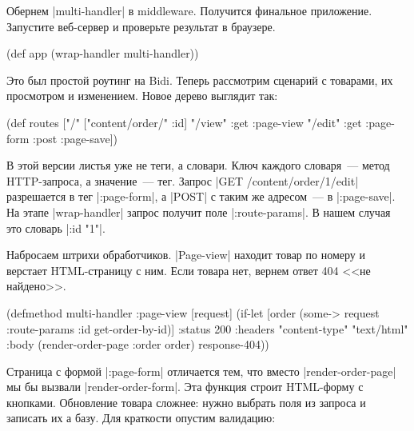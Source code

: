 Обернем \spverb|multi-handler| в middleware. Получится финальное
приложение. Запустите веб-сервер и проверьте результат в браузере.

\begin{english}
  \begin{clojure}
(def app (wrap-handler multi-handler))
  \end{clojure}
\end{english}

Это был простой роутинг на Bidi. Теперь рассмотрим сценарий с товарами, их
просмотром и изменением. Новое дерево выглядит так:

\begin{english}
  \begin{clojure}
(def routes
  ["/" {["content/order/" :id]
        {"/view" {:get  :page-view}
         "/edit" {:get  :page-form
                  :post :page-save}}}])
  \end{clojure}
\end{english}

В этой версии листья уже не теги, а словари. Ключ каждого словаря~--- метод
HTTP-запроса, а значение~--- тег. Запрос \spverb|GET /content/order/1/edit|
разрешается в тег \spverb|:page-form|, а \spverb|POST| с таким же адресом~--- в \spverb|:page-save|.
На этапе \spverb|wrap-handler| запрос получит поле \spverb|:route-params|.
В нашем случая это словарь \spverb|{:id "1"}|.

Набросаем штрихи обработчиков. \spverb|Page-view| находит товар по номеру и
верстает HTML-страницу с ним. Если товара нет, вернем ответ 404 <<не найдено>>.

\begin{english}
  \begin{clojure}
(defmethod multi-handler :page-view
  [request]
  (if-let [order (some-> request :route-params :id get-order-by-id)]
    {:status 200
     :headers {"content-type" "text/html"}
     :body (render-order-page {:order order})}
    response-404))
  \end{clojure}
\end{english}

Страница с формой \spverb|:page-form| отличается тем, что вместо
\spverb|render-order-page| мы бы вызвали \spverb|render-order-form|. Эта функция
строит HTML-форму с кнопками. Обновление товара сложнее: нужно выбрать поля из
запроса и записать их а базу. Для краткости опустим валидацию:

\begin{english}
\end{english}

